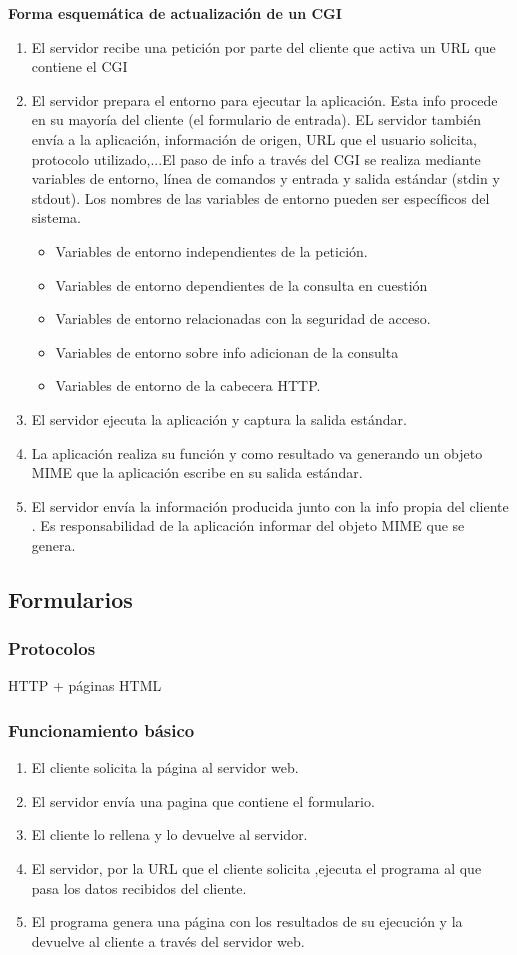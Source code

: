 \documentclass{apuntes}
\begin{document}
\textbf{Forma esquemática de actualización de un CGI}
\begin{enumerate}
\item El servidor recibe una petición por parte del cliente que activa un URL que contiene el CGI
\item El servidor prepara el entorno para ejecutar la aplicación. Esta info procede en su mayoría del cliente (el formulario de entrada). EL servidor también envía a la aplicación, información de origen, URL que el usuario solicita, protocolo utilizado,...El paso de info a través del CGI se realiza mediante variables de entorno, línea de comandos y entrada y salida estándar (stdin y stdout). Los nombres de las variables de entorno pueden ser específicos del sistema.
\begin{itemize}
\item Variables de entorno independientes de la petición.
\item Variables de entorno dependientes de la consulta en cuestión
\item Variables de entorno relacionadas con la seguridad de acceso.
\item Variables de entorno sobre info adicionan de la consulta
\item Variables de entorno de la cabecera HTTP.
\end{itemize}
\item El  servidor ejecuta la aplicación y captura la salida estándar.
\item La aplicación realiza su función y como resultado va generando un objeto MIME que la aplicación escribe en su salida estándar.
\item El servidor envía la información producida junto con la info propia del cliente . Es responsabilidad de la aplicación informar del objeto MIME que se genera.
\end{enumerate}

\subsection{Formularios}
\subsubsection{Protocolos}
HTTP + páginas HTML

\subsubsection{Funcionamiento básico}
\begin{enumerate}
\item El cliente solicita la página al servidor web.
\item El servidor envía una pagina que contiene el formulario.
\item El cliente lo rellena y lo devuelve al servidor.
\item El servidor, por la URL que el cliente solicita ,ejecuta el programa al que pasa los datos recibidos del cliente.
\item El programa genera una página con los resultados de su ejecución y la devuelve al cliente a través del servidor web.
\end{enumerate}
\end{document}

